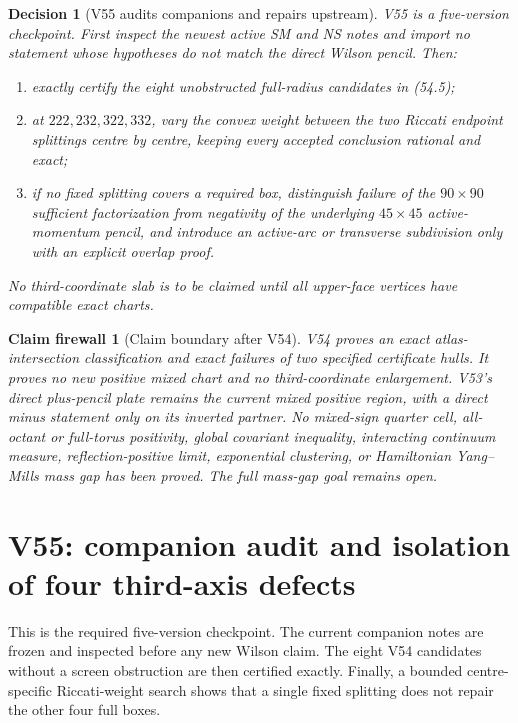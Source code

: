 \documentclass[11pt,oneside]{article}
\newtheorem{firewall}[theorem]{Claim firewall}
\newtheorem{decision}[theorem]{Decision}
\theoremstyle{definition}
\theoremstyle{remark}
\begin{document}
\begin{decision}[V55 audits companions and repairs upstream]
\label{dec:newv54-next}
V55 is a five-version checkpoint.  First inspect the newest active
SM and NS notes and import no statement whose hypotheses do not
match the direct Wilson pencil.  Then:
\begin{enumerate}
\item exactly certify the eight unobstructed full-radius candidates
in (54.5);
\item at \(222,232,322,332\), vary the convex weight between the
two Riccati endpoint splittings centre by centre, keeping every
accepted conclusion rational and exact;
\item if no fixed splitting covers a required box, distinguish
failure of the \(90\times90\) sufficient factorization from
negativity of the underlying \(45\times45\) active-momentum pencil,
and introduce an active-arc or transverse subdivision only with an
explicit overlap proof.
\end{enumerate}
No third-coordinate slab is to be claimed until all upper-face
vertices have compatible exact charts.
\end{decision}

\begin{firewall}[Claim boundary after V54]
\label{fire:newv54-final}
V54 proves an exact atlas-intersection classification and exact
failures of two specified certificate hulls.  It proves no new
positive mixed chart and no third-coordinate enlargement.  V53's
direct plus-pencil plate remains the current mixed positive region,
with a direct minus statement only on its inverted partner.  No
mixed-sign quarter cell, all-octant or full-torus positivity,
global covariant inequality, interacting continuum measure,
reflection-positive limit, exponential clustering, or Hamiltonian
Yang--Mills mass gap has been proved.  The full mass-gap goal
remains open.
\end{firewall}

\section{V55: companion audit and isolation of four third-axis defects}
\label{sec:newv55-audit-eight-charts}

This is the required five-version checkpoint.  The current
companion notes are frozen and inspected before any new Wilson
claim.  The eight V54 candidates without a screen obstruction are
then certified exactly.  Finally, a bounded centre-specific
Riccati-weight search shows that a single fixed splitting does not
repair the other four full boxes.
\end{document}
